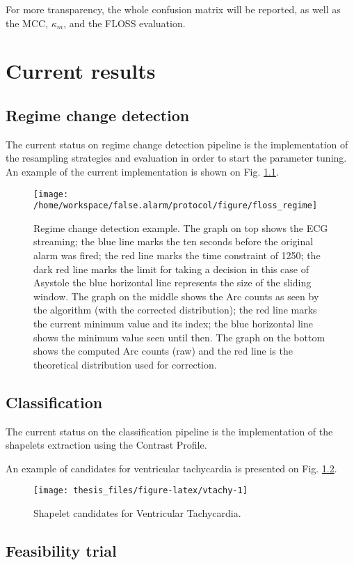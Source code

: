 \documentclass[12pt,twoside]{fmupthesis}
\begin{document}
For more transparency, the whole confusion matrix will be reported, as well as the MCC, \(\kappa_m\), and
the FLOSS evaluation.

\hypertarget{current-results}{%
\chapter{Current results}\label{current-results}}

\hypertarget{regime-change-detection}{%
\section{Regime change detection}\label{regime-change-detection}}

The current status on regime change detection pipeline is the implementation of the resampling strategies and evaluation in
order to start the parameter tuning. An example of the current implementation is shown on Fig. \ref{fig:flossregime}.
\begin{figure}

{\centering \texttt{[image: /home/workspace/false.alarm/protocol/figure/floss\_regime]} 

}

\caption{Regime change detection example. The graph on top shows the ECG streaming; the blue line marks the ten seconds before the original alarm was fired; the red line marks the time constraint of 1250; the dark red line marks the limit for taking a decision in this case of Asystole the blue horizontal line represents the size of the sliding window. The graph on the middle shows the Arc counts as seen by the algorithm (with the corrected distribution); the red line marks the current minimum value and its index; the blue horizontal line shows the minimum value seen until then. The graph on the bottom shows the computed Arc counts (raw) and the red line is the theoretical distribution used for correction.}\label{fig:flossregime}
\end{figure}
\hypertarget{classification-1}{%
\section{Classification}\label{classification-1}}

The current status on the classification pipeline is the implementation of the shapelets extraction
using the Contrast Profile.

An example of candidates for ventricular tachycardia is presented on Fig. \ref{fig:vtachy}.
\begin{figure}

{\centering \texttt{[image: thesis\_files/figure-latex/vtachy-1]} 

}

\caption{Shapelet candidates for Ventricular Tachycardia.}\label{fig:vtachy}
\end{figure}
\hypertarget{feasibility-trial}{%
\section{Feasibility trial}\label{feasibility-trial}}
\end{document}
